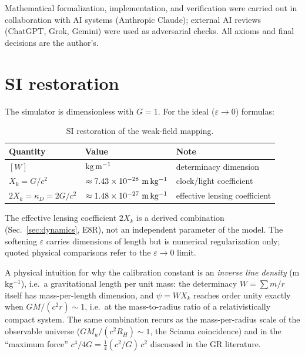 \documentclass[aps,reprint,amsmath,amssymb,nofootinbib,superscriptaddress,floatfix]{revtex4-2}
\newcommand{\Kt}{X_k}
\begin{document}
\begin{acknowledgments}
Mathematical formalization, implementation, and verification were
carried out in collaboration with AI systems (Anthropic Claude);
external AI reviews (ChatGPT, Grok, Gemini) were used as adversarial
checks. All axioms and final decisions are the author's.
\end{acknowledgments}

\appendix

\section{SI restoration}
\label{app:si}

The simulator is dimensionless with $G = 1$.
For the ideal ($\varepsilon \to 0$) formulas:

\begin{table}[h]
\caption{\label{tab:si}SI restoration of the weak-field mapping.}
\begin{ruledtabular}
\begin{tabular}{llp{}}
Quantity & Value & Note \\
\hline
$[W]$ & ${\rm kg\,m^{-1}}$ & determinacy dimension \\
$\Kt = G/c^2$ & $\approx 7.43\times10^{-28}\ {\rm m\,kg^{-1}}$ &
clock/light coefficient \\
$2\Kt = \kappa_D = 2G/c^2$ & $\approx 1.48\times10^{-27}\ {\rm m\,kg^{-1}}$ &
effective lensing coefficient \\
\end{tabular}
\end{ruledtabular}
\end{table}

The effective lensing coefficient $2\Kt$ is a derived combination
(Sec.~\ref{sec:dynamics}, E8R), not an independent parameter of the
model.
The softening $\varepsilon$ carries dimensions of length but is
numerical regularization only; quoted physical comparisons refer to
the $\varepsilon \to 0$ limit.

A physical intuition for why the calibration constant is an
\emph{inverse line density} (m\,kg$^{-1}$), i.e.\ a gravitational
length per unit mass: the determinacy $W = \sum m/r$ itself has
mass-per-length dimension, and $\psi = W\Kt$ reaches order unity
exactly when $GM/(c^2 r) \sim 1$, i.e.\ at the mass-to-radius ratio of
a relativistically compact system.
The same combination recurs as the mass-per-radius scale of the
observable universe ($GM_u/(c^2R_H) \sim 1$, the Sciama coincidence)
and in the ``maximum force'' $c^4/4G = \tfrac14(c^2/G)\,c^2$ discussed
in the GR literature.
\end{document}
